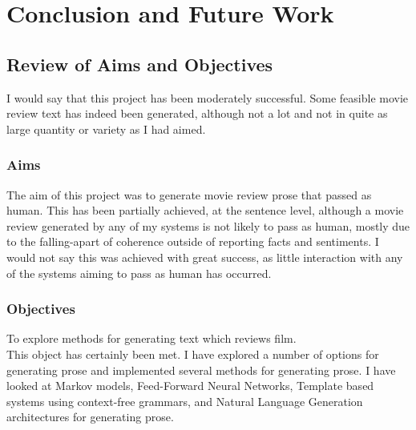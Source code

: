 \chapter{\label{ch:7-conclusion} Conclusion and Future Work}



\section{Review of Aims and Objectives}
I would say that this project has been moderately successful. Some feasible movie review text has indeed been generated, although not a lot and not in quite as large quantity or variety as I had aimed.
\subsection{Aims}
The aim of this project was to generate movie review prose that passed as human. This has been partially achieved, at the sentence level, although a movie review generated by any of my systems is not likely to pass as human, mostly due to the falling-apart of coherence outside of reporting facts and sentiments. I would not say this was achieved with great success, as little interaction with any of the systems aiming to pass as human has occurred.
\subsection{Objectives}
To explore methods for generating text which reviews film.\\
This object has certainly been met. I have explored a number of options for generating prose and implemented several methods for generating prose. I have looked at Markov models, Feed-Forward Neural Networks, Template based systems using context-free grammars, and Natural Language Generation architectures for generating prose.\\

